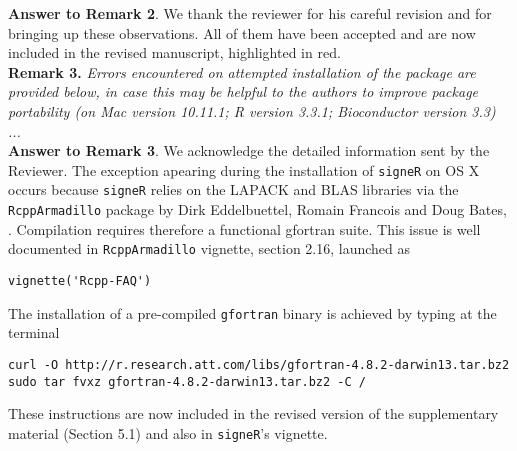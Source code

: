 \documentclass[11pt]{amsart}
\begin{document}
\textbf{Answer to Remark 2}. We thank the reviewer for his careful revision and for bringing up these observations. All of them have been accepted and are now included in the revised manuscript, highlighted in red.
\\

\textbf{Remark 3.}
\emph{Errors encountered on attempted installation of the package are provided below, in case this may be helpful to the authors to improve package portability (on Mac version 10.11.1; R version 3.3.1; Bioconductor version 3.3) ...}
\\

\textbf{Answer to Remark 3}. We acknowledge the detailed information sent by the Reviewer. The exception apearing during the installation of \texttt{signeR} on OS X occurs because \texttt{signeR} relies on the LAPACK and BLAS libraries via the \texttt{RcppArmadillo} package by Dirk Eddelbuettel, Romain Francois and Doug Bates, \cite{E}. Compilation requires therefore a functional gfortran suite. This issue is well documented in \texttt{RcppArmadillo} vignette, section 2.16, launched as
\begin{lstlisting}[]
vignette('Rcpp-FAQ')
\end{lstlisting}
The installation of a pre-compiled \texttt{gfortran} binary is achieved by typing at the terminal
\begin{lstlisting}[]
curl -O http://r.research.att.com/libs/gfortran-4.8.2-darwin13.tar.bz2
sudo tar fvxz gfortran-4.8.2-darwin13.tar.bz2 -C /
\end{lstlisting}
These instructions are now included in the revised version of the
supplementary material (Section 5.1) and also in \texttt{signeR}'s
vignette.


\end{document}
